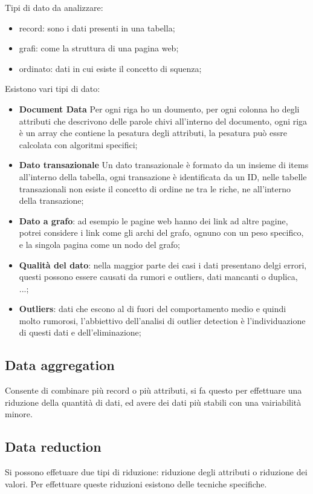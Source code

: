 \documentclass[12pt]{article}
\begin{document}
Tipi di dato da analizzare:
\begin{itemize}
    \item record: sono i dati presenti in una tabella;
    \item grafi: come la struttura di una pagina web;
    \item ordinato: dati in cui esiste il concetto di squenza;
\end{itemize}

Esistono vari tipi di dato:
\begin{itemize}
    \item \textbf{Document Data} Per ogni riga ho un doumento, per ogni colonna ho degli attributi che descrivono delle parole chivi all'interno del documento, ogni riga \`e un array che contiene la pesatura degli attributi, la pesatura pu\`o essre calcolata con algoritmi specifici;
    \item \textbf{Dato transazionale} Un dato transazionale \`e formato da un insieme di items all'interno della tabella, ogni transazione \`e identificata da un ID, nelle tabelle transazionali non esiste il concetto di ordine ne tra le riche, ne all'interno della transazione;
    \item \textbf{Dato a grafo}: ad esempio le pagine web hanno dei link ad altre pagine, potrei considere i link come gli archi del grafo, ognuno con un peso specifico, e la singola pagina come un nodo del grafo;
    \item \textbf{Qualit\`a del dato}: nella maggior parte dei casi i dati presentano delgi errori, questi possono essere causati da rumori e outliers, dati mancanti o duplica, ...;
    \item \textbf{Outliers}: dati che escono al di fuori del comportamento medio e quindi molto rumorosi, l'abbiettivo dell'analisi di outlier detection \`e l'individuazione di questi dati e dell'eliminazione;
\end{itemize}




\subsection{Data aggregation}
Consente di combinare pi\`u record o pi\`u attributi, si fa questo per effettuare una riduzione della quantit\`a di dati, ed avere dei dati pi\`u stabili con una vairiabilit\`a minore.

\subsection{Data reduction}
Si possono effetuare due tipi di riduzione: riduzione degli attributi o riduzione dei valori. Per effettuare queste riduzioni esistono delle tecniche specifiche.
\end{document}
